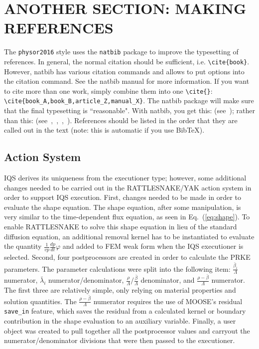 \documentclass[12pt]{article}
\newcommand{\eqt}[1]{Eq.~(\ref{#1})}                     %
\begin{document}
%
\section{ANOTHER SECTION: MAKING REFERENCES} 
\label{sect::references}

The \texttt{physor2016} style uses the \texttt{natbib} package to improve the typesetting of references. In general, the normal citation should be sufficient, i.e. \verb|\cite{book}|. However, natbib has various citation commands and allows to put options into the citation command. See the natbib manual for more information. If you want to cite more than one work, simply combine them into one \verb|\cite{}|: \verb|\cite{book_A,book_B,article_Z,manual_X}|. The natbib package will make sure that the final typesetting is ``reasonable". With natbib, you get this: (see~\cite{proc_paper,website,journal,book}); rather than this: (see~\cite{proc_paper},~\cite{website},~\cite{journal},~\cite{book}). References should be listed in the order that they are called out in the text (note: this is automatic if you use Bib\TeX).

\subsection{Action System}

IQS derives its uniqueness from the executioner type; however, some additional changes needed to be carried out in the RATTLESNAKE/YAK action system in order to support IQS execution.   First, changes needed to be made in order to evaluate the shape equation.  The shape equation, after some manipulation, is very similar to the time-dependent flux equation, as seen in \eqt{eq:shape}.  To enable RATTLESNAKE to solve this shape equation in lieu of the standard diffusion equation, an additional removal kernel has to be instantiated to evaluate the quantity $\frac{1}{vp}\frac{dp}{dt}\varphi$ and added to FEM weak form  when the IQS executioner is selected.  Second, four postprocessors are created in order to calculate the PRKE parameters.  The parameter calculations were split into the following item: $\frac{\bar{\beta}_i}{\Lambda}$ numerator, $\bar{\lambda}_i$ numerator/denominator, $\frac{\rho}{\Lambda}/\frac{\bar{\beta}}{\Lambda}$ denominator, and $\frac{\rho-\bar{\beta}}{\Lambda}$ numerator.  The first three are relatively simple, only relying on material properties and solution quantities.  The $\frac{\rho-\bar{\beta}}{\Lambda}$ numerator requires the use of MOOSE's residual {\tt save\_in} feature, which saves the residual from a calculated kernel or boundary contribution in the shape evaluation to an auxiliary variable.  Finally, a user object was created to pull together all the postprocessor values and carryout the numerator/denominator divisions that were then passed to the executioner.
\end{document}
